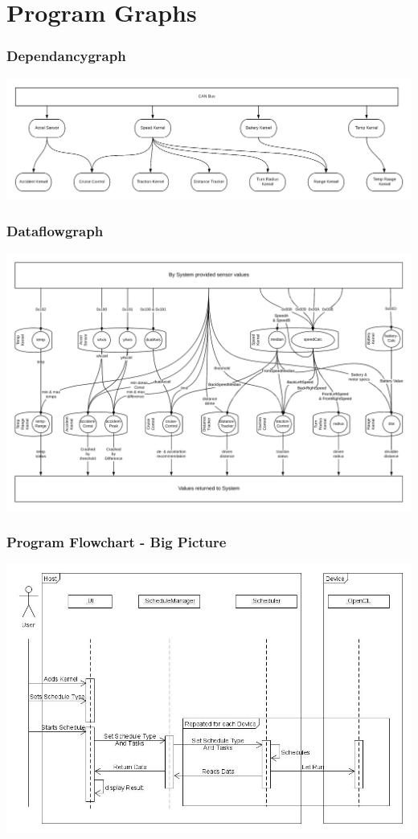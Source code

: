 \documentclass{beamer}
\begin{document}
\section{Program Graphs}
\begin{frame}
    \frametitle{Dependancygraph}
    \includegraphics[width=\textwidth]{res/Dependencie_Graph.png}
\end{frame}
\begin{frame}
    \frametitle{Dataflowgraph}
    \includegraphics[width=.9\textwidth]{res/Data_Flow_Kernel.png}
\end{frame}
\begin{frame}
    \frametitle{Program Flowchart - Big Picture}
    \includegraphics[width=.9\textwidth]{res/Program_Flowchart.jpg}
\end{frame}
\end{document}
